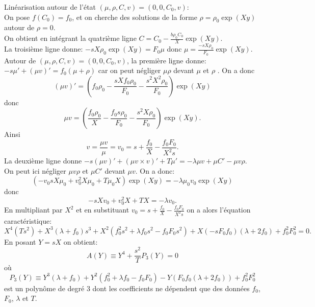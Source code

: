 \documentclass[11pt]{article}
\begin{document}
Linéarisation autour de l’état  $(\mu,\rho,C,v) = (0,0,C_0,v)$: \\
On pose $f(C_0) = f_0$, et on cherche des solutions de la forme $\rho = \rho_0 \exp(Xy)$ autour de $\rho=0$.\\ 
On obtient en intégrant la quatrième ligne $C= C_0 - \frac{b\rho_0 C_0}{X}\exp(Xy).$\\
La troisième ligne donne: $-sX\rho_0\exp(Xy)=F_0\mu$ donc $\mu = \frac{-sX\rho_0}{F_0}\exp(Xy)$.\\
Autour de $(\mu,\rho,C,v) = (0,0,C_0,v)$, la première ligne donne: $-s\mu' + (\mu v)' = f_0(\mu + \rho)$ car on peut négliger $\mu\rho$ devant $\mu$ et $\rho$ . On a donc \begin{equation}
	(\mu v)'=(f_0\rho_0-\frac{sXf_0\rho_0}{F_0}-\frac{s^2X^2\rho_0}{F_0})\exp(Xy)
\end{equation}
donc \begin{equation}
	\mu v = (\frac{f_0\rho_0}{X}- \frac{f_0s\rho_0}{F_0}-\frac{s^2X\rho_0}{F_0})\exp(Xy).
\end{equation}
Ainsi \begin{equation}
	v= \frac{\mu v}{\mu} = v_0 = s + \frac{f_0}{X}-\frac{f_0F_0}{X^2s}  .
\end{equation}
La deuxième ligne donne $-s (\mu v)'+(\mu v\times v)' +T\mu'=-\lambda\mu v+\mu C'-\mu v \rho$. \\
On peut ici négliger $\mu v\rho$ et $\mu C'$ devant $\mu v$. On a donc: \begin{equation}
	(-v_0sX\mu_0 + v_0^2X\mu_0 +T\mu_0X)\exp(Xy) = -\lambda\mu_0v_0\exp(Xy)
\end{equation}
donc \begin{equation}
	-sXv_0 + v_0^2X+ TX = -\lambda v_0.
\end{equation}
En multipliant par $X^2$ et en substituant $v_0 =  s + \frac{f_0}{X}-\frac{f_0F_0}{X^2s}$ on a alors l’équation caractéristique:
\begin{equation} \label{eq:P}
	X^4(Ts^2) + X^3(\lambda + f_0)s^3+ X^2(f_0^2s^2+ \lambda f_0 s^2 - f_0F_0s^2)+ X(-sF_0f_0)(\lambda+2f_0) + f_0^2F_0^2=0.
\end{equation}
En posant $Y = sX$ on obtient: \begin{equation}
	A(Y) \equiv Y^4+\frac{s^2}{T}P_3(Y)=0 \label{eq:PY}
\end{equation} où \begin{equation}
		P_3(Y) \equiv  Y^3(\lambda + f_0)+ Y^2(f_0^2+ \lambda f_0 - f_0F_0)- Y(F_0f_0(\lambda+2f_0)) + f_0^2F_0^2
\end{equation} est un polynôme de degré 3 dont les coefficients ne dépendent que des données $f_0$, $F_0$, $\lambda$ et $T$. \\
\end{document}
